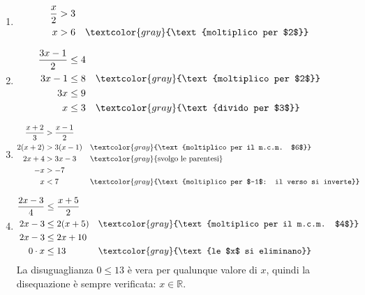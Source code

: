 \begin{question}[ID=1.3, subtitle={Disequazioni di primo grado con frazioni e parentesi}, difficulty=media, tags={disequazioni lineari}]
\begin{explanation}
\begin{enumerate}
\[\begin{aligned}
    x &\leq -1 && \textcolor{gray}{\text{divido per $-2$: il verso si inverte}}
    \end{aligned}\]
    \item \[\begin{aligned}
    \dfrac{x}{2} &> 3\\
    x &> 6 && \textcolor{gray}{\text{moltiplico per $2$}}
    \end{aligned}\]
    \item \[\begin{aligned}
    \dfrac{3x-1}{2} &\leq 4\\
    3x-1 &\leq 8 && \textcolor{gray}{\text{moltiplico per $2$}}\\
    3x &\leq 9\\
    x &\leq 3 && \textcolor{gray}{\text{divido per $3$}}
    \end{aligned}\]
    \item \[\begin{aligned}
    \dfrac{x+2}{3} &> \dfrac{x-1}{2}\\
    2(x+2) &> 3(x-1) && \textcolor{gray}{\text{moltiplico per il m.c.m. $6$}}\\
    2x+4 &> 3x-3 && \textcolor{gray}{\text{svolgo le parentesi}}\\
    -x &> -7\\
    x &< 7 && \textcolor{gray}{\text{moltiplico per $-1$: il verso si inverte}}
    \end{aligned}\]
    \item \[\begin{aligned}
    \dfrac{2x-3}{4} &\leq \dfrac{x+5}{2}\\
    2x-3 &\leq 2(x+5) && \textcolor{gray}{\text{moltiplico per il m.c.m. $4$}}\\
    2x-3 &\leq 2x+10\\
    0\cdot x &\leq 13 && \textcolor{gray}{\text{le $x$ si eliminano}}
    \end{aligned}\]
    La disuguaglianza $0\leq 13$ è vera per qualunque valore di $x$, quindi la disequazione è sempre verificata: $x\in\mathbb{R}$.
\end{enumerate}
\end{explanation}
\end{question}


